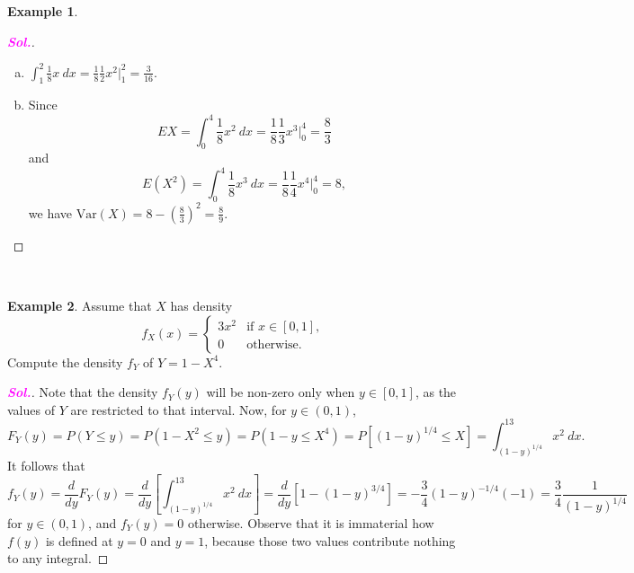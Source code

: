 \documentclass[12pt,a4paper]{article}
\theoremstyle{definition}
\newtheorem{example}{Example}[section]
\theoremstyle{definition}
\theoremstyle{definition}
\theoremstyle{definition}
\theoremstyle{remark}
\theoremstyle{definition}
\newcommand{\dispsty}{\displaystyle}
\newcommand{\sol}{\textcolor{magenta}{\bf \textit{Sol.}}\quad}
\newcommand{\Var}{\text{Var}}
\begin{document}
\begin{example}
\begin{proof}[\sol]
\begin{enumerate}[(a)]
\begin{figure}[h!]
				\caption{}
			\end{figure}
			\item $\dispsty\int_{1}^2\frac{1}{8}x\ dx=\frac{1}{8}\frac{1}{2}x^2\Bigg|_1^2=\frac{3}{16}$.
			\item Since \[
			EX=\int_0^4\frac{1}{8}x^2\ dx=\frac{1}{8}\frac{1}{3}x^3\Bigg|_0^4=\frac{8}{3}
			\] and \[
			E(X^2)=\int_0^4\frac{1}{8}x^3\ dx=\frac{1}{8}\frac{1}{4}x^4\Bigg|_0^4=8,
			\] we have $\Var(X)=8-\dispsty\left(\frac{8}{3}\right)^2=\frac{8}{9}$.
		\end{enumerate}
	\end{proof}
\end{example}
\
\begin{example}
	Assume that $X$ has density \[
	f_X(x)=\begin{cases}
	3x^2 &\text{if $x\in[0,1]$},\\
	0 &\text{otherwise}.
	\end{cases}
	\] Compute the density $f_Y$ of $Y=1-X^4$.\begin{proof}[\sol]
		Note that the density $f_Y(y)$ will be non-zero only when $y\in[0,1]$, as the values of $Y$ are restricted to that interval. Now, for $y\in(0,1)$, \[
		F_Y(y)=P(Y\leq y)=P(1-X^2\leq y)=P(1-y\leq X^4)=P[(1-y)^{1/4}\leq X]=\int_{(1-y)^{1/4}}^13x^2\ dx.
		\] It follows that \[
		f_Y(y)=\frac{d}{dy}F_Y(y)=\frac{d}{dy}\left[\int_{(1-y)^{1/4}}^13x^2\ dx\right]=\frac{d}{dy}\left[1-(1-y)^{3/4}\right]=-\frac{3}{4}(1-y)^{-1/4}(-1)=\frac{3}{4}\frac{1}{(1-y)^{1/4}}
		\] for $y\in(0,1)$, and $f_Y(y)=0$ otherwise. Observe that it is immaterial how $f(y)$ is defined at $y=0$ and $y=1$, because those two values contribute nothing to any integral.
	\end{proof} 
\end{example}

\newpage
\end{document}
